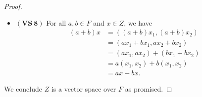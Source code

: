 \begin{Exercise}
\begin{proof}
\begin{itemize}
\item $\mathbf{(VS\ 8)}$
For all $a,b\in F$ and $x\in Z$, we have
\begin{align*}
(a+b)x
&= ( (a+b) x_1, (a+b) x_2 ) \\
&= ( a x_1 + b x_1, a x_2 + b x_2 ) \\
&= (a x_1, a x_2) + (b x_1 + b x_2) \\
&= a(x_1, x_2) + b(x_1, x_2) \\
&= a x + b x.
\end{align*}
\end{itemize}
We conclude $Z$ is a vector space over $F$ as promised.
\end{proof}
\end{Exercise}